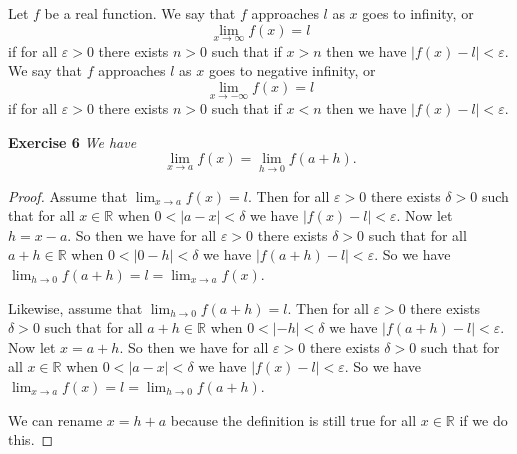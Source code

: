 \documentclass{article}
\begin{document}
\begin{flushleft}
Let $f$ be a real function. We say that $f$ approaches $l$ as $x$ goes to infinity, or
\[
\lim_{x \rightarrow \infty} f(x) = l
\]
if for all $\varepsilon > 0$ there exists $n > 0$ such that if $x > n$ then we have $|f(x)-l| < \varepsilon$. We say that $f$ approaches $l$ as $x$ goes to negative infinity, or
\[
\lim_{x \rightarrow -\infty} f(x) = l
\]
if for all $\varepsilon > 0$ there exists $n > 0$ such that if $x < n$ then we have $|f(x)-l| < \varepsilon$.\newline

\textbf{Exercise 6}
\textsl{We have
\[
\lim_{x \rightarrow a} f(x) = \lim_{h \rightarrow 0} f(a + h).
\]}
\begin{proof}
Assume that $\lim_{x \rightarrow a} f(x) = l$. Then for all $\varepsilon > 0$ there exists $\delta > 0$ such that for all $x \in \mathbb{R}$ when $0 < |a-x| < \delta$ we have $|f(x)-l| < \varepsilon$. Now let $h=x-a$. So then we have for all $\varepsilon > 0$ there exists $\delta > 0$ such that for all $a+h \in \mathbb{R}$ when $0 < |0-h| < \delta$ we have $|f(a+h)-l| < \varepsilon$. So we have $\lim_{h \rightarrow 0} f(a+h) = l = \lim_{x \rightarrow a} f(x)$.\newline

Likewise, assume that $\lim_{h \rightarrow 0} f(a+h) = l$. Then for all $\varepsilon > 0$ there exists $\delta > 0$ such that for all $a+h \in \mathbb{R}$ when $0 < |-h| < \delta$ we have $|f(a+h)-l| < \varepsilon$. Now let $x=a+h$. So then we have for all $\varepsilon > 0$ there exists $\delta > 0$ such that for all $x \in \mathbb{R}$ when $0 < |a-x| < \delta$ we have $|f(x)-l| < \varepsilon$. So we have $\lim_{x \rightarrow a} f(x) = l = \lim_{h \rightarrow 0} f(a+h)$.\newline

We can rename $x=h+a$ because the definition is still true for all $x \in \mathbb{R}$ if we do this.
\end{proof}

\end{flushleft}
\end{document}
